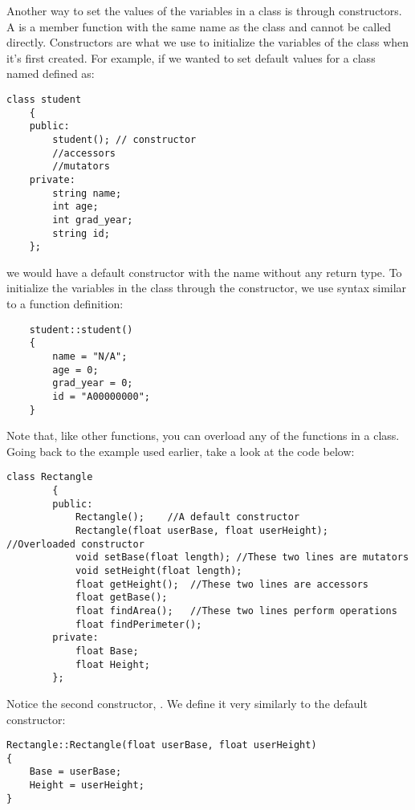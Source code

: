 
Another way to set the values of the variables in a class is through constructors. 
A  is a member function with the same name as the class and cannot be called directly. 
Constructors are what we use to initialize the variables of the class when it's first created. 
For example, if we wanted to set default values for a class named  defined as: 

\begin{lstlisting}
class student
	{
	public:
		student(); // constructor
		//accessors
		//mutators
	private:
		string name;
		int age;
		int grad_year;
		string id;
	};
\end{lstlisting}

\noindent we would have a default constructor with the name  without any return type. 
To initialize the variables in the class through the constructor, we use syntax similar to a function definition:

\begin{lstlisting}
	student::student()
	{
		name = "N/A";
		age = 0;
		grad_year = 0;
		id = "A00000000";
	}
\end{lstlisting}


Note that, like other functions, you can overload any of the functions in a class. 
Going back to the  example used earlier, take a look at the code below:

\begin{lstlisting}
class Rectangle
		{
		public: 
			Rectangle();	//A default constructor
			Rectangle(float userBase, float userHeight);	//Overloaded constructor
			void setBase(float length); //These two lines are mutators
			void setHeight(float length);
			float getHeight();	//These two lines are accessors
			float getBase();	
			float findArea();	//These two lines perform operations
			float findPerimeter();
		private:
			float Base;
			float Height;
		};
\end{lstlisting}

Notice the second constructor, . 
We define it very similarly to the default constructor:

\begin{lstlisting}
Rectangle::Rectangle(float userBase, float userHeight)
{
	Base = userBase;
	Height = userHeight;
}
\end{lstlisting}



